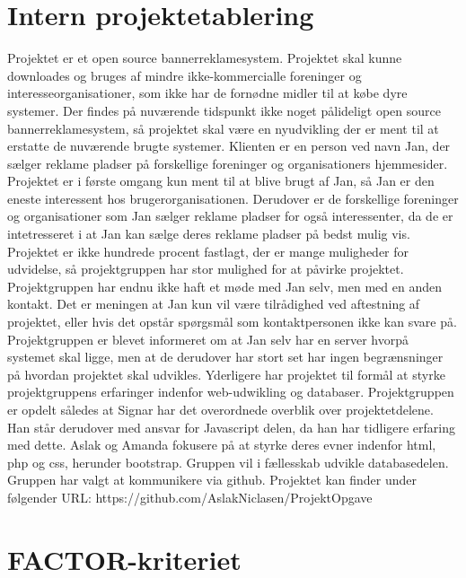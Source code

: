 \documentclass[a4paper,12pt]{article}
\begin{document}
\section{Intern projektetablering}


Projektet er et open source bannerreklamesystem. Projektet skal kunne downloades og bruges af mindre ikke-kommercialle foreninger og interesseorganisationer, som ikke har de fornødne midler til at købe dyre systemer. Der findes på nuværende tidspunkt ikke noget pålideligt open source bannerreklamesystem, så projektet skal være en nyudvikling der er ment til at erstatte de nuværende brugte systemer. Klienten er en person ved navn Jan, der sælger reklame pladser på forskellige foreninger og organisationers hjemmesider. Projektet er i første omgang kun ment til at blive brugt af Jan, så Jan er den eneste interessent hos brugerorganisationen. Derudover er de forskellige foreninger og organisationer som Jan sælger reklame pladser for også interessenter, da de er intetresseret i at Jan kan sælge deres reklame pladser på bedst mulig vis. Projektet er ikke hundrede procent fastlagt, der er mange muligheder for udvidelse, så projektgruppen har stor mulighed for at påvirke projektet. Projektgruppen har endnu ikke haft et møde med Jan selv, men med en anden kontakt. Det er meningen at Jan kun vil være tilrådighed ved aftestning af projektet, eller hvis det opstår spørgsmål som kontaktpersonen ikke kan svare på. Projektgruppen er blevet informeret om at Jan selv har en server hvorpå systemet skal ligge, men at de derudover har stort set har ingen begrænsninger på hvordan projektet skal udvikles. 
\newline
Yderligere har projektet til formål at styrke projektgruppens erfaringer indenfor web-udwikling og databaser.
\newline
\newline
Projektgruppen er opdelt således at Signar har det overordnede overblik over projektetdelene. Han står derudover med ansvar for Javascript delen, da han har tidligere erfaring med dette. Aslak og Amanda fokusere på at styrke deres evner indenfor html, php og css, herunder bootstrap. Gruppen vil i fællesskab udvikle databasedelen.
\newline
Gruppen har valgt at kommunikere via github. 
Projektet kan finder under følgender URL: https://github.com/AslakNiclasen/ProjektOpgave 
\newline
\newline 

\section{FACTOR-kriteriet}
\end{document}
